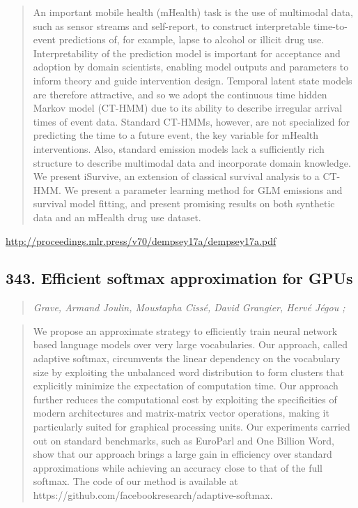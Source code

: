 \documentclass{article}
\begin{document}
\begin{quote}
    An important mobile health (mHealth) task is the use of multimodal data, such as sensor streams and self-report, to construct interpretable time-to-event predictions of, for example, lapse to alcohol or illicit drug use. Interpretability of the prediction model is important for acceptance and adoption by domain scientists, enabling model outputs and parameters to inform theory and guide intervention design. Temporal latent state models are therefore attractive, and so we adopt the continuous time hidden Markov model (CT-HMM) due to its ability to describe irregular arrival times of event data. Standard CT-HMMs, however, are not specialized for predicting the time to a future event, the key variable for mHealth interventions. Also, standard emission models lack a sufficiently rich structure to describe multimodal data and incorporate domain knowledge. We present iSurvive, an extension of classical survival analysis to a CT-HMM. We present a parameter learning method for GLM emissions and survival model fitting, and present promising results on both synthetic data and an mHealth drug use dataset.  \end{quote}

\href{http://proceedings.mlr.press/v70/dempsey17a/dempsey17a.pdf}{http://proceedings.mlr.press/v70/dempsey17a/dempsey17a.pdf}

\subsection{343. Efficient softmax approximation for GPUs}

\begin{quote}
\footnotesize{\textit{Grave, Armand Joulin, Moustapha Cissé, David Grangier, Hervé Jégou ;}}
\end{quote}

\begin{quote}
    We propose an approximate strategy to efficiently train neural network based language models over very large vocabularies. Our approach, called adaptive softmax, circumvents the linear dependency on the vocabulary size by exploiting the unbalanced word distribution to form clusters that explicitly minimize the expectation of computation time. Our approach further reduces the computational cost by exploiting the specificities of modern architectures and matrix-matrix vector operations, making it particularly suited for graphical processing units. Our experiments carried out on standard benchmarks, such as EuroParl and One Billion Word, show that our approach brings a large gain in efficiency over standard approximations while achieving an accuracy close to that of the full softmax. The code of our method is available at https://github.com/facebookresearch/adaptive-softmax.  \end{quote}
\end{document}
